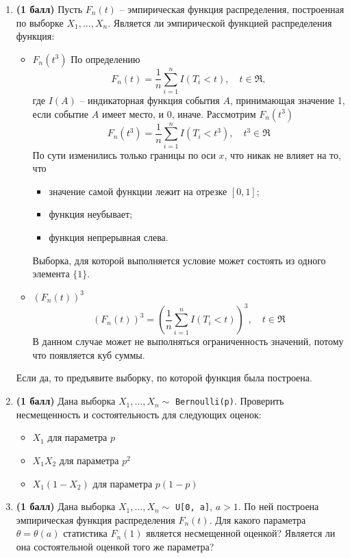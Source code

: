 \documentclass{assignment}
\begin{document}
\begin{enumerate}
    \item \textbf{(1 балл)} Пусть $F_n(t)$ -- эмпирическая функция распределения, построенная по выборке $X_1, \ldots, X_n$. Является ли эмпирической функцией распределения функция:
    \begin{itemize}
        \item $F_n(t^3)$
        \start
        По определению
        \begin{equation}
            F_n(t) = \frac{1}{n}\sum_{i=1}^{n} I(T_i < t), \quad t \in \Re,
        \end{equation}
        где $I(A)$ -- индикаторная функция события $A$, принимающая значение 1, если событие $A$ имеет место, и 0, иначе. Рассмотрим $F_n(t^3)$
        \begin{equation}
            F_n(t^3) = \frac{1}{n}\sum_{i=1}^{n} I(T_i < t^3), \quad t^3 \in \Re
        \end{equation}
        По сути изменились только границы по оси $x$, что никак не влияет на то, что
        \begin{itemize}
            \item значение самой функции лежит на отрезке $[0,1]$;
            \item функция неубывает;
            \item функция непрерывная слева.
        \end{itemize}
        Выборка, для которой выполняется условие может состоять из одного элемента $\{1\}$.
        \finish
        \item $(F_n(t))^3$
        \start
        \begin{equation}
            (F_n(t))^3 = \left(\frac{1}{n}\sum_{i=1}^{n} I(T_i < t)\right)^3, \quad t \in \Re
        \end{equation}
        В данном случае может не выполняться ограниченность значений, потому что появляется куб суммы.
        \finish
    \end{itemize}
    Если да, то предъявите выборку, по которой функция была построена.

    \item \textbf{(1 балл)} Дана выборка $X_1, \ldots, X_n \sim $ \texttt{Bernoulli(p)}. Проверить несмещенность и состоятельность для следующих оценок:
    \begin{itemize}
        \item $X_1$ для параметра $p$
        \item $X_1X_2$ для параметра $p^2$
        \item $X_1(1 - X_2)$ для параметра $p(1 - p)$
    \end{itemize}

    \item \textbf{(1 балл)} Дана выборка $X_1, \ldots, X_n \sim $ \texttt{U[0, a]}, $a > 1$. По ней построена эмпирическая функция распределения $F_n(t)$. Для какого параметра $\theta = \theta(a)$ статистика $F_n(1)$ является несмещенной оценкой? Является ли она состоятельной оценкой того же параметра?
\end{enumerate}
\end{document}
